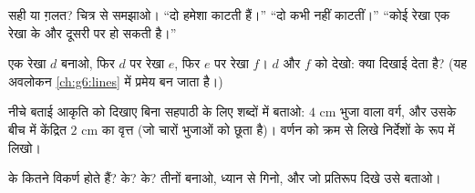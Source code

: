 \begin{exercise}[$\star$]\label{exo:g4:geometry:8}
सही या ग़लत? चित्र से समझाओ।
``दो  हमेशा काटती हैं।''
``दो  कभी नहीं काटतीं।''
``कोई रेखा एक रेखा के  और दूसरी पर  हो
सकती है।''
\end{exercise}

\begin{exercise}[$\star\star$]\label{exo:g4:geometry:9}
एक रेखा $d$ बनाओ, फिर $d$ पर  रेखा $e$, फिर $e$ पर  रेखा
$f$। $d$ और $f$ को देखो: क्या दिखाई देता है?
(यह अवलोकन \cref{ch:g6:lines} में प्रमेय बन जाता है।)
\end{exercise}

\begin{exercise}[$\star\star$]\label{exo:g4:geometry:10}
नीचे बताई आकृति को दिखाए बिना सहपाठी के लिए शब्दों में बताओ:
$4$ cm भुजा वाला वर्ग, और उसके बीच में केंद्रित $2$ cm 
का वृत्त (जो चारों भुजाओं को छूता है)। वर्णन को क्रम से लिखे
निर्देशों के रूप में लिखो।
\end{exercise}

\begin{exercise}[$\star\star$]\label{exo:g4:geometry:11}
 के कितने विकर्ण होते हैं?  के?  के?
तीनों बनाओ, ध्यान से गिनो, और जो प्रतिरूप दिखे उसे बताओ।
\end{exercise}
